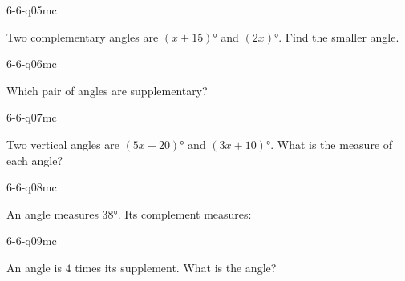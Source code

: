 \begin{practiceQuestion}{6-6-q05}{mc}
\begin{questionText}
Two complementary angles are $(x + 15)°$ and $(2x)°$. Find the smaller angle.
\end{questionText}
\end{practiceQuestion}

\begin{practiceQuestion}{6-6-q06}{mc}
\begin{questionText}
Which pair of angles are supplementary?
\end{questionText}
\end{practiceQuestion}

\begin{practiceQuestion}{6-6-q07}{mc}
\begin{questionText}
Two vertical angles are $(5x - 20)°$ and $(3x + 10)°$. What is the measure of each angle?
\end{questionText}
\end{practiceQuestion}

\begin{practiceQuestion}{6-6-q08}{mc}
\begin{questionText}
An angle measures $38°$. Its complement measures:
\end{questionText}
\end{practiceQuestion}

\begin{practiceQuestion}{6-6-q09}{mc}
\begin{questionText}
An angle is $4$ times its supplement. What is the angle?
\end{questionText}
\end{practiceQuestion}

